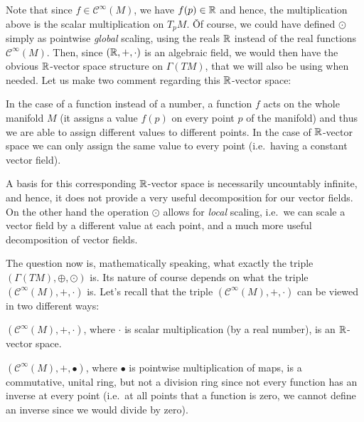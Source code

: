 Note that since $f\in \mathcal{C}^\infty(M)$, we have $f(p)\in \mathbb{R}$ and hence, the multiplication above is the scalar
multiplication on $T_p M$. \v

Of course, we could have defined $\odot$ simply as pointwise \emph{global} scaling, using the reals $\mathbb{R}$ instead of
the real functions $\mathcal{C}^\infty(M)$. Then, since $(\mathbb{R},+,\cdot)$ is an algebraic field, we would then have the
obvious $\mathbb{R}$-vector space structure on $\Gamma(TM)$, that we will also be using when needed. Let us make two comment
regarding this $\mathbb{R}$-vector space:
\bit
\item In the case of a function instead of a number, a function $f$ acts on the whole manifold $M$ (it assigns a
value $f(p)$ on every point $p$ of the manifold) and thus we are able to assign different values to different points.
In the case of $\mathbb{R}$-vector space we can only assign the same value to every point (i.e.\ having a constant vector field).
\item A basis for this corresponding $\mathbb{R}$-vector space is necessarily uncountably infinite, and hence, it does not
provide a very useful decomposition for our vector fields. On the other hand the operation $\odot$ allows for
\emph{local} scaling, i.e.\ we can scale a vector field by a different value at each point, and a much more useful
decomposition of vector fields.
\eit

The question now is, mathematically speaking, what exactly the triple $(\Gamma(TM),\oplus,\odot)$ is. Its nature of
course depends on what the triple $(\mathcal{C}^\infty(M),+,\cdot)$ is. Let's recall that the triple $
(\mathcal{C}^\infty(M),+,\cdot)$ can be viewed in two different ways:
\bit
\item $(\mathcal{C}^\infty(M),+,\cdot)$, where $\cdot$ is scalar multiplication (by a real number), is an
$\mathbb{R}$-vector space.
\item $(\mathcal{C}^\infty(M),+,\bullet)$, where $\bullet$ is pointwise multiplication of maps, is a commutative,
unital ring, but not a division ring since not every function has an inverse at every point (i.e.\ at all points that a
function is zero, we cannot define an inverse since we would divide by zero).
\eit

